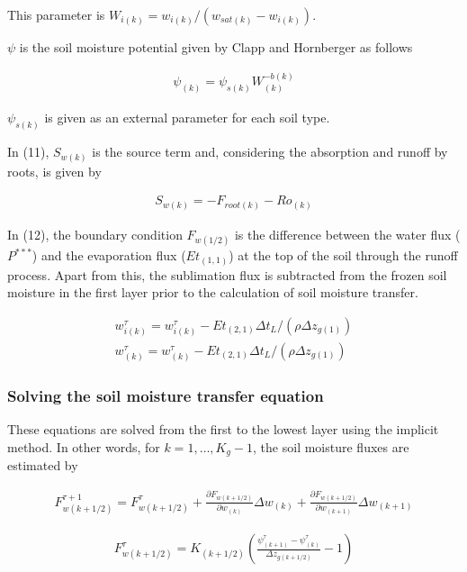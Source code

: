 This parameter is \(W_{i(k)} = w_{i(k)}/(w_{sat(k)}-w_{i(k)})\).

\(\psi\) is the soil moisture potential given by Clapp and Hornberger as
follows

\begin{eqnarray}
 \psi_{(k)} = \psi_{s(k)} W_{(k)}^{-b(k)}
\end{eqnarray}

\(\psi_{s(k)}\) is given as an external parameter for each soil type.

In (11), \(S_{w(k)}\) is the source term and, considering the absorption
and runoff by roots, is given by

\begin{eqnarray}
 S_{w(k)} = - F_{root(k)} - Ro_{(k)}
\end{eqnarray}

In (12), the boundary condition \(F_{w(1/2)}\) is the difference between
the water flux (\(P^{***}\)) and the evaporation flux (\(Et_{(1,1)}\))
at the top of the soil through the runoff process. Apart from this, the
sublimation flux is subtracted from the frozen soil moisture in the
first layer prior to the calculation of soil moisture transfer.

\begin{eqnarray}
 w_{i(k)}^{\tau} = w_{i(k)}^{\tau} - Et_{(2,1)} \Delta t_L /(\rho \Delta z_{g(1)})\\
 w_{(k)}^{\tau} = w_{(k)}^{\tau} - Et_{(2,1)} \Delta t_L /(\rho \Delta z_{g(1)})
\end{eqnarray}

\hypertarget{solving-the-soil-moisture-transfer-equation}{%
\subsubsection{Solving the soil moisture transfer
equation}\label{solving-the-soil-moisture-transfer-equation}}

These equations are solved from the first to the lowest layer using the
implicit method. In other words, for \(k=1,\ldots,K_g-1\), the soil
moisture fluxes are estimated by

\begin{eqnarray}
  F_{w(k+1/2)}^{\tau+1} = F_{w(k+1/2)}^{\tau}
+\frac{\partial {F}_{w(k+1/2)}}{\partial w_{(k)}}
 \Delta w_{(k)}
+\frac{\partial {F}_{w(k+1/2)}}{\partial w_{(k+1)}}
 \Delta w_{(k+1)}
\end{eqnarray}

\begin{eqnarray}
  F_{w(k+1/2)}^{\tau} =
K_{(k+1/2)} \left(\frac{\psi_{(k+1)}^{\tau} - \psi_{(k)}^{\tau}}{\Delta z_{g(k+1/2)}} - 1 \right)
\end{eqnarray}

